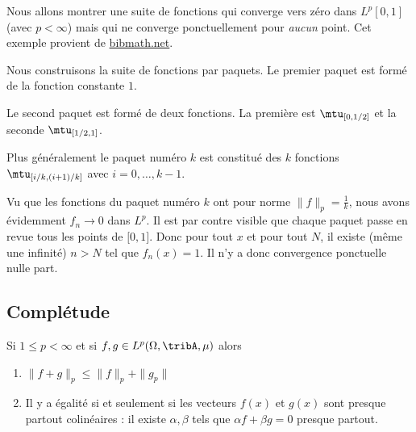 \begin{example}
    Nous allons montrer une suite de fonctions qui converge vers zéro dans \( L^p[0,1]\) (avec \( p<\infty\)) mais qui ne converge ponctuellement pour \emph{aucun} point. Cet exemple provient de \href{http://www.bibmath.net/dico/index.php?action=affiche&quoi=./b/bosseglissante.html}{bibmath.net}. 


    Nous construisons la suite de fonctions par paquets. Le premier paquet est formé de la fonction constante \( 1\).

    Le second paquet est formé de deux fonctions. La première est \( \mtu_{\mathopen[0 , 1/2 \mathclose]}\) et la seconde \( \mtu_{\mathopen[ 1/2 , 1 \mathclose]}\).

    Plus généralement le paquet numéro \( k\) est constitué des \( k\) fonctions \( \mtu_{\mathopen[ i/k , (i+1)/k \mathclose]}\) avec \( i=0,\ldots, k-1\).

    Vu que les fonctions du paquet numéro \( k\) ont pour norme \( \| f \|_p=\frac{1}{ k }\), nous avons évidemment \( f_n\to 0\) dans \( L^p\). Il est par contre visible que chaque paquet passe en revue tous les points de \( \mathopen[ 0 , 1 \mathclose]\). Donc pour tout \( x\) et pour tout \( N\), il existe (même une infinité) \( n>N\) tel que \( f_n(x)=1\). Il n'y a donc convergence ponctuelle nulle part.
\end{example}

\subsection{Complétude}

\begin{proposition}     \label{PropInegMinkKUpRHg}
    Si \( 1\leq p<\infty\) et si \( f,g\in L^p(\Omega,\tribA,\mu)\) alors
    \begin{enumerate}
        \item
            \( \| f+g \|_p\leq \| f \|_p+\| g_p \|\)
        \item
            Il y a égalité si et seulement si les vecteurs \( f(x)\) et \( g(x)\) sont presque partout colinéaires : il existe \( \alpha,\beta\) tels que \( \alpha f+\beta g=0\) presque partout.
    \end{enumerate}
\end{proposition}


